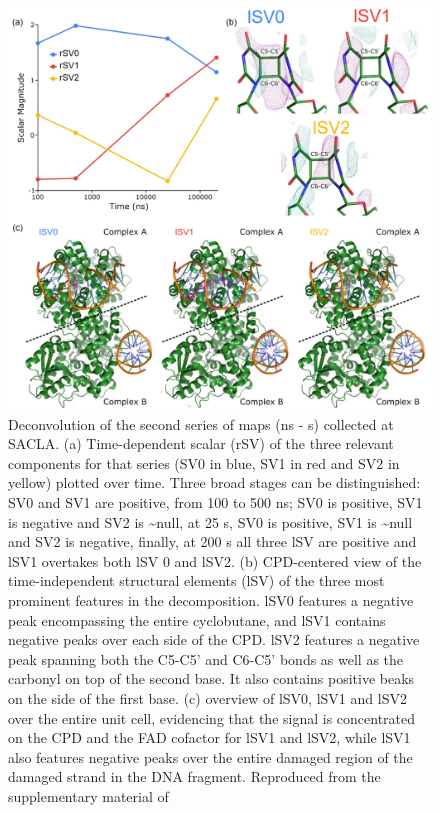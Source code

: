 \begin{figure}[H]
  \centering
  \includegraphics[width=\textwidth]{images/cracry/SACLA_SVD.pdf}
  \hfill
  \caption{Deconvolution of the second series of maps (ns - \textmu s) collected at SACLA. (a) Time-dependent scalar (rSV) of the three relevant components for that series (SV0 in blue, SV1 in red and SV2 in yellow) plotted over time. Three broad stages can be distinguished: SV0 and SV1 are positive, from 100 to 500 ns; SV0 is positive, SV1 is negative and SV2 is \textasciitilde null, at 25 \textmu s, SV0 is positive, SV1 is \textasciitilde null and SV2 is negative, finally, at 200 \textmu s all three lSV are positive and lSV1 overtakes both lSV 0 and lSV2. (b) CPD-centered view of the time-independent structural elements (lSV) of the three most prominent features in the decomposition. lSV0 features a negative peak encompassing the entire cyclobutane, and lSV1 contains negative peaks over each side of the CPD. lSV2 features a negative peak spanning both the C5-C5' and C6-C5' bonds as well as the carbonyl on top of the second base. It also contains positive beaks on the side of the first base. (c) overview of lSV0, lSV1 and lSV2 over the entire unit cell, evidencing that the signal is concentrated on the CPD and the FAD cofactor for lSV1 and lSV2, while lSV1 also features negative peaks over the entire damaged region of the damaged strand in the DNA fragment. Reproduced from the supplementary material of \cite{maestre-reynaVisualizingDNARepair2023a}}\label{fig:SACLA_SVD_MmCPDII}
\end{figure}

